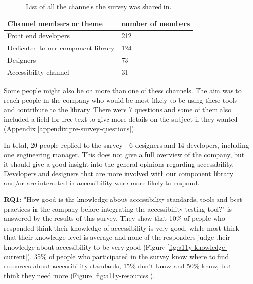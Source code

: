 \documentclass{master_thesis}
\begin{document}
\begin{table}[H]
	\centering
	\begin{tabular}{|l|l|}
		\hline
		\textbf{Channel members or theme} & \textbf{number of members}  \\
		\hline
		Front end developers  & 212  \\
		\hline
		Dedicated to our component library  & 124  \\
		\hline
		Designers  & 73  \\
		\hline
		Accessibility channel  & 31  \\
		\hline
	\end{tabular}
	\caption{List of all the channels the survey was shared in.}
	\label{table:survey-shared}
\end{table}

Some people might also be on more than one of these channels. The aim was to reach people in the company who would be most likely to be using these tools and contribute to the library. There were 7 questions and some of them also included a field for free text to give more details on the subject if they wanted (Appendix \ref{appendix:pre-survey-questions}).

In total, 20 people replied to the survey - 6 designers and 14 developers, including one engineering manager. This does not give a full overview of the company, but it should give a good insight into the general opinions regarding accessibility. Developers and designers that are more involved with our component library and/or are interested in accessibility were more likely to respond.

\textbf{RQ1:} "How good is the knowledge about accessibility standards, tools and best practices in the company before integrating the accessibility testing tool?" is answered by the results of this survey. They show that 10\% of people who responded think their knowledge of accessibility is very good, while most think that their knowledge level is average and none of the responders judge their knowledge about accessibility to be very good (Figure \ref{fig:a11y-knowledge-current}). 35\% of people who participated in the survey know where to find resources about accessibility standards, 15\% don't know and 50\% know, but think they need more (Figure \ref{fig:a11y-resources}).
\end{document}
